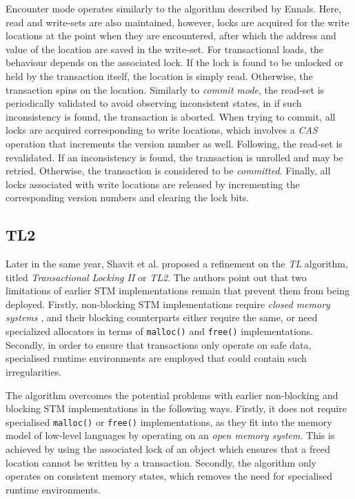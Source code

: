Encounter mode operates similarly to the algorithm described by Ennals\cite{ennals-stm}. Here, read and write-sets are also maintained, however, locks are acquired for the write locations at the point when they are encountered, after which the address and value of the location are saved in the write-set. For transactional loads, the behaviour depends on the associated lock. If the lock is found to be unlocked or held by the transaction itself, the location is simply read. Otherwise, the transaction spins on the location\cite{tl}. Similarly to \textit{commit mode}, the read-set is periodically validated to avoid observing inconsistent states, in if such inconsistency is found, the transaction is aborted\cite{tl}. When trying to commit, all locks are acquired corresponding to write locations, which involves a \textit{CAS} operation that increments the version number as well. Following, the read-set is revalidated. If an inconsistency is found, the transaction is unrolled and may be retried. Otherwise, the transaction is considered to be \textit{committed}. Finally, all locks associated with write locations are released by incrementing the corresponding version numbers and clearing the lock bits\cite{tl}.\par

\subsection{TL2}
Later in the same year, Shavit et al. proposed a refinement on the \textit{TL} algorithm, titled \textit{Transactional Locking II} or \textit{TL2}. The authors point out that two limitations of earlier STM implementations remain that prevent them from being deployed. Firstly, non-blocking STM implementations require \textit{closed memory systems}%
, and their blocking counterparts either require the same, or need specialized allocators in terms of \texttt{malloc()} and \texttt{free()} implementations\cite{tl2}. Secondly, in order to ensure that transactions only operate on safe data, specialised runtime environments are employed that could contain such irregularities\cite{tl2}.

The algorithm overcomes the potential problems with earlier non-blocking and blocking STM implementations in the following ways. Firstly, it does not require specialised \texttt{malloc()} or \texttt{free()} implementations, as they fit into the memory model of low-level languages by operating on an \textit{open memory system}. This is achieved by using the associated lock of an object which ensures that a freed location cannot be written by a transaction\cite{tl}. Secondly, the algorithm only operates on consistent memory states, which removes the need for specialised runtime environments\cite{tl2}.

